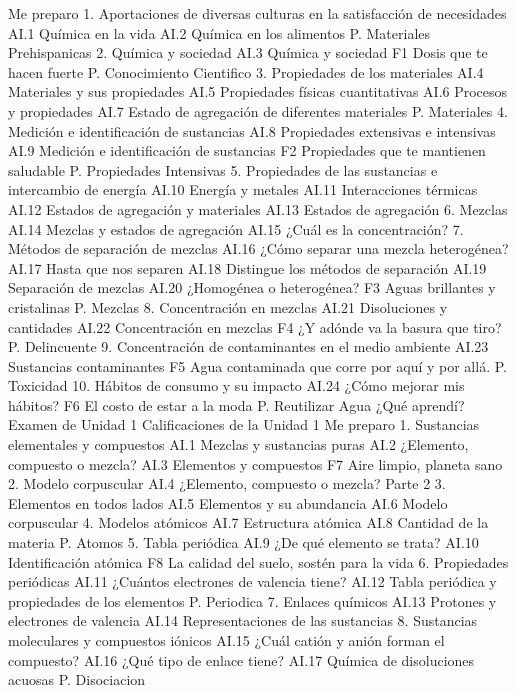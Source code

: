 Me preparo
1.	Aportaciones de diversas culturas en la satisfacción de necesidades
AI.1	Química en la vida
AI.2	Química en los alimentos
P. Materiales Prehispanicas
2.	Química y sociedad
AI.3	Química y sociedad
F1	Dosis que te hacen fuerte
P. Conocimiento Cientifico
3.	Propiedades de los materiales
AI.4	Materiales y sus propiedades
AI.5	Propiedades físicas cuantitativas
AI.6	Procesos y propiedades
AI.7	Estado de agregación de diferentes materiales
P. Materiales
4.	Medición e identificación de sustancias
AI.8	Propiedades extensivas e intensivas
AI.9	Medición e identificación de sustancias
F2	Propiedades que te mantienen saludable
P. Propiedades Intensivas
5.	Propiedades de las sustancias e intercambio de energía
AI.10	Energía y metales
AI.11	Interacciones térmicas
AI.12	Estados de agregación y materiales
AI.13	Estados de agregación
6.	Mezclas
AI.14	Mezclas y estados de agregación
AI.15	¿Cuál es la concentración?
7.	Métodos de separación de mezclas
AI.16	¿Cómo separar una mezcla heterogénea?
AI.17	Hasta que nos separen
AI.18	Distingue los métodos de separación
AI.19	Separación de mezclas
AI.20	¿Homogénea o heterogénea?
F3	Aguas brillantes y cristalinas
P. Mezclas
8.	Concentración en mezclas
AI.21	Disoluciones y cantidades
AI.22	Concentración en mezclas
F4	¿Y adónde va la basura que tiro?
P. Delincuente
9.	Concentración de contaminantes en el medio ambiente
AI.23	Sustancias contaminantes
F5	Agua contaminada que corre por aquí y por allá.
P. Toxicidad
10.	Hábitos de consumo y su impacto
AI.24	¿Cómo mejorar mis hábitos?
F6	El costo de estar a la moda
P. Reutilizar Agua
¿Qué aprendí?
Examen de Unidad 1
Calificaciones de la Unidad 1
Me preparo
1.	Sustancias elementales y compuestos
AI.1	Mezclas y sustancias puras
AI.2	¿Elemento, compuesto o mezcla?
AI.3	Elementos y compuestos
F7	Aire limpio, planeta sano
2.	Modelo corpuscular
AI.4	¿Elemento, compuesto o mezcla? Parte 2
3.	Elementos en todos lados
AI.5	Elementos y su abundancia
AI.6	Modelo corpuscular
4.	Modelos atómicos
AI.7	Estructura atómica
AI.8	Cantidad de la materia
P. Atomos
5.	Tabla periódica
AI.9	¿De qué elemento se trata?
AI.10	Identificación atómica
F8	La calidad del suelo, sostén para la vida
6.	Propiedades periódicas
AI.11	¿Cuántos electrones de valencia tiene?
AI.12	Tabla periódica y propiedades de los elementos
P. Periodica
7.	Enlaces químicos
AI.13	Protones y electrones de valencia
AI.14	Representaciones de las sustancias
8.	Sustancias moleculares y compuestos iónicos
AI.15	¿Cuál catión y anión forman el compuesto?
AI.16	¿Qué tipo de enlace tiene?
AI.17	Química de disoluciones acuosas
P. Disociacion
